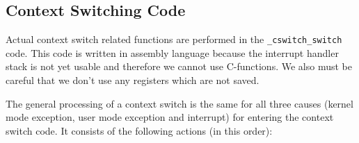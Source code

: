 \documentclass[twoside,a4paper]{report}
\begin{document}
\subsection{Context Switching Code}

Actual context switch related functions are performed in the
\texttt{\_cswitch\_switch} code. This code is written in assembly
language because the interrupt handler stack is not yet usable and
therefore we cannot use C-functions. We also must be careful that we
don't use any registers which are not saved.

The general processing of a context switch is the same for all three
causes (kernel mode exception, user mode exception and interrupt) for
entering the context switch code. It consists of the following actions
(in this order):
\end{document}
